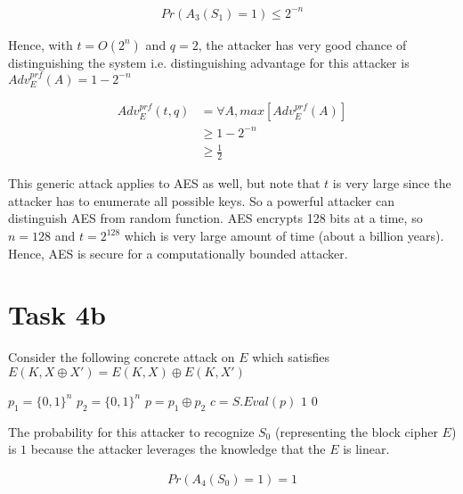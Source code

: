 \documentclass{article}
\begin{document}
    \begin{align*}
        Pr(A_3(S_1) = 1) \le 2^{-n}
    \end{align*}

    Hence, with $t = O(2^n)$ and $q = 2$, the attacker has very good chance of distinguishing the system i.e. distinguishing advantage for this attacker is $Adv_E^{prf}(A) = 1 - 2^{-n}$

    \begin{align*}
        Adv_E^{prf} (t, q)  & = \forall A, max[ Adv_E^{prf}(A) ] \\
                            & \ge 1 - 2^{-n} \\
                            & \ge \frac{1}{2}
    \end{align*}

    This generic attack applies to AES as well, but note that $t$ is very large since the attacker has to enumerate all possible keys. So a powerful attacker can distinguish AES from random function. AES encrypts 128 bits at a time, so $n = 128$ and $t = 2^{128}$ which is very large amount of time (about a billion years). Hence, AES is secure for a computationally bounded attacker.

    \section*{Task 4b}
    Consider the following concrete attack on $E$ which satisfies $E(K, X \oplus X') = E(K, X) \oplus E(K, X')$

    \begin{algorithm}[H]
        \begin{algorithmic}
                \State $p_1 = \{0, 1\}^n$
                \State $p_2 = \{0, 1\}^n$
                \State $p = p_1 \oplus p_2$
                \State $c = S.Eval(p)$
                    \State \Return $1$
                \Else
                    \State \Return $0$
                \EndIf
            \EndProcedure
        \end{algorithmic}
    \end{algorithm}

    The probability for this attacker to recognize $S_0$ (representing the block cipher $E$) is $1$ because the attacker leverages the knowledge that the $E$ is linear.

    \begin{align*}
        Pr(A_4(S_0) = 1) = 1
    \end{align*}
\end{document}
